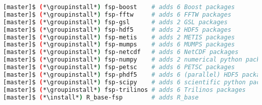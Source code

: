 \begin{lstlisting}[language=bash,keywords={},upquote=true,keepspaces]
[master]$ (*\groupinstall*) fsp-boost    # adds 6 Boost packages
[master]$ (*\groupinstall*) fsp-fftw     # adds 6 FFTW packages
[master]$ (*\groupinstall*) fsp-gsl      # adds 2 GSL packages
[master]$ (*\groupinstall*) fsp-hdf5     # adds 2 HDF5 packages
[master]$ (*\groupinstall*) fsp-metis    # adds 2 METIS packages
[master]$ (*\groupinstall*) fsp-mumps    # adds 6 MUMPS packages
[master]$ (*\groupinstall*) fsp-netcdf   # adds 6 NetCDF packages
[master]$ (*\groupinstall*) fsp-numpy    # adds 2 numerical python packages
[master]$ (*\groupinstall*) fsp-petsc    # adds 6 PETSC packages
[master]$ (*\groupinstall*) fsp-phdf5    # adds 6 (parallel) HDF5 packages
[master]$ (*\groupinstall*) fsp-scipy    # adds 6 scientific python packages
[master]$ (*\groupinstall*) fsp-trilinos # adds 6 Trilinos packages
[master]$ (*\install*) R_base-fsp        # adds R_base 
\end{lstlisting}
